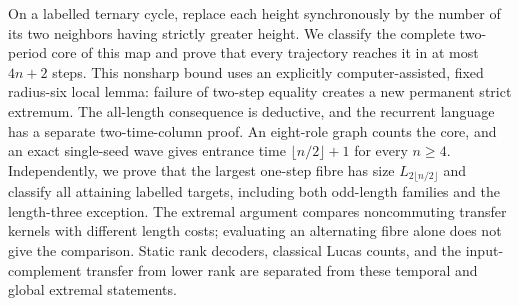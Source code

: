 On a labelled ternary cycle, replace each height synchronously by the
number of its two neighbors having strictly greater height. We classify
the complete two-period core of this map and prove that every trajectory
reaches it in at most $4n+2$ steps. This nonsharp bound uses an explicitly
computer-assisted, fixed radius-six local lemma: failure of two-step
equality creates a new permanent strict extremum. The all-length
consequence is deductive, and the recurrent language has a separate
two-time-column proof. An eight-role graph counts the core, and an exact
single-seed wave gives entrance time $\lfloor n/2\rfloor+1$ for every
$n\ge4$. Independently, we prove that the largest one-step fibre has
size $L_{2\lfloor n/2\rfloor}$ and classify all attaining labelled
targets, including both odd-length families and the length-three
exception. The extremal argument compares noncommuting transfer kernels
with different length costs; evaluating an alternating fibre alone does
not give the comparison. Static rank decoders, classical Lucas counts,
and the input-complement transfer from lower rank are separated from
these temporal and global extremal statements.
